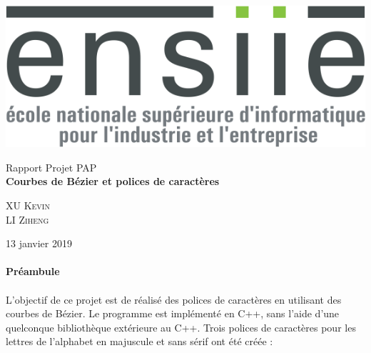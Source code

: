 \documentclass[a4paper, 12pt]{article}
\begin{document}
\begin{titlepage}
			\includegraphics[scale=0.25]{Images/logo_ENSIIE.png} 
			\begin{center}
				\vspace*{6cm}
				{ \huge Rapport Projet PAP \\ \vspace*{2cm}
				\textbf{Courbes de Bézier et polices de caractères} \\
				}
			\vspace*{2cm}
				\begin{center} \large
					\textsc{XU} \textsc{Kevin}\\
					\textsc{LI} \textsc{Ziheng}
				\end{center}
				\begin{minipage}{0.4\textwidth}
				\end{minipage}
				{\large 13 janvier 2019}
			\end{center}
	\end{titlepage}
	
	\renewcommand{\contentsname}{Sommaire} 
	{\setlength{\baselineskip}{1.2\baselineskip}
\tableofcontents\par} %
		
	\newpage
	\vspace*{3cm} 
	\paragraph{\Huge{Préambule}}

	\paragraph{}
	L'objectif de ce projet est de réalisé des polices de caractères en utilisant des courbes de Bézier. Le programme est implémenté en C++, sans l’aide d’une quelconque bibliothèque extérieure au C++.
	Trois polices de caractères pour les lettres de l’alphabet en majuscule et sans sérif ont été créée : 	
	
\end{document}

